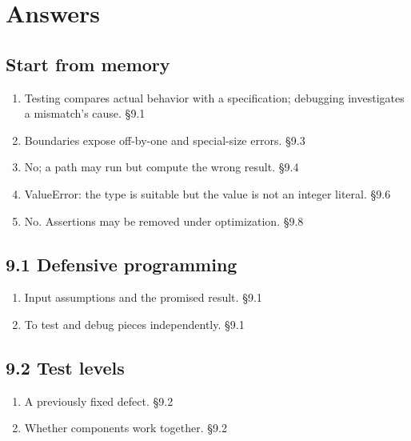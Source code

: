 \documentclass[11pt]{article}
\begin{document}
\clearpage
\section{Answers}
\begin{keepsection}\subsection{Start from memory}

\begin{enumerate}
\item Testing compares actual behavior with a specification; debugging investigates a mismatch’s cause. \hfill{\small\color{FAUblue}§9.1}
\item Boundaries expose off-by-one and special-size errors. \hfill{\small\color{FAUblue}§9.3}
\item No; a path may run but compute the wrong result. \hfill{\small\color{FAUblue}§9.4}
\item ValueError: the type is suitable but the value is not an integer literal. \hfill{\small\color{FAUblue}§9.6}
\item No. Assertions may be removed under optimization. \hfill{\small\color{FAUblue}§9.8}
\end{enumerate}

\end{keepsection}
\begin{keepsection}\subsection{9.1 Defensive programming}

\begin{enumerate}
\item Input assumptions and the promised result. \hfill{\small\color{FAUblue}§9.1}
\item To test and debug pieces independently. \hfill{\small\color{FAUblue}§9.1}
\end{enumerate}

\end{keepsection}
\begin{keepsection}\subsection{9.2 Test levels}

\begin{enumerate}
\item A previously fixed defect. \hfill{\small\color{FAUblue}§9.2}
\item Whether components work together. \hfill{\small\color{FAUblue}§9.2}
\end{enumerate}

\end{keepsection}
\end{document}
